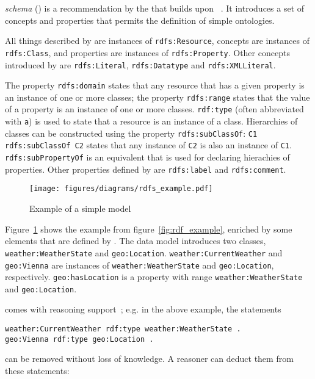  \emph{schema} () is a recommendation by the  that builds upon ~\cite{RDFS}. It introduces a set of concepts and properties that permits the definition of simple ontologies. 

All things described by  are instances of \texttt{rdfs:Resource}, concepts are instances of \texttt{rdfs:Class}, and properties are instances of \texttt{rdfs:Property}. Other concepts introduced by  are \texttt{rdfs:Literal}, \texttt{rdfs:Datatype} and \texttt{rdfs:XMLLiteral}.

The property \texttt{rdfs:domain} states that any resource that has a given property is an instance of one or more classes; the property \texttt{rdfs:range} states that the value of a property is an instance of one or more classes. \texttt{rdf:type} (often abbreviated with \texttt{a}) is used to state that a resource is an instance of a class. Hierarchies of classes can be constructed using the property \texttt{rdfs:subClassOf}: \texttt{C1 rdfs:subClassOf C2} states that any instance of \texttt{C2} is also an instance of \texttt{C1}. \texttt{rdfs:subPropertyOf} is an equivalent that is used for declaring hierachies of properties. Other properties defined by  are \texttt{rdfs:label} and \texttt{rdfs:comment}.

\begin{figure}
\centering
\texttt{[image: figures/diagrams/rdfs\_example.pdf]}
\caption{Example of a simple  model}
\label{fig:rdfs_example}
\end{figure}

Figure~\ref{fig:rdfs_example} shows the example from figure~\ref{fig:rdf_example}, enriched by some elements that are defined by . The data model introduces two classes, \texttt{weather:WeatherState} and \texttt{geo:Location}. \texttt{weather:CurrentWeather} and \texttt{geo:Vienna} are instances of \texttt{weather:WeatherState} and \texttt{geo:Location}, respectively. \texttt{geo:hasLocation} is a property with range \texttt{weather:WeatherState} and \texttt{geo:Location}.

 comes with reasoning support~\cite{RDF_semantics}; e.g. in the above example, the statements

\begin{verbatim}
weather:CurrentWeather rdf:type weather:WeatherState .
geo:Vienna rdf:type geo:Location .
\end{verbatim}

can be removed without loss of knowledge. A reasoner can deduct them from these statements:

